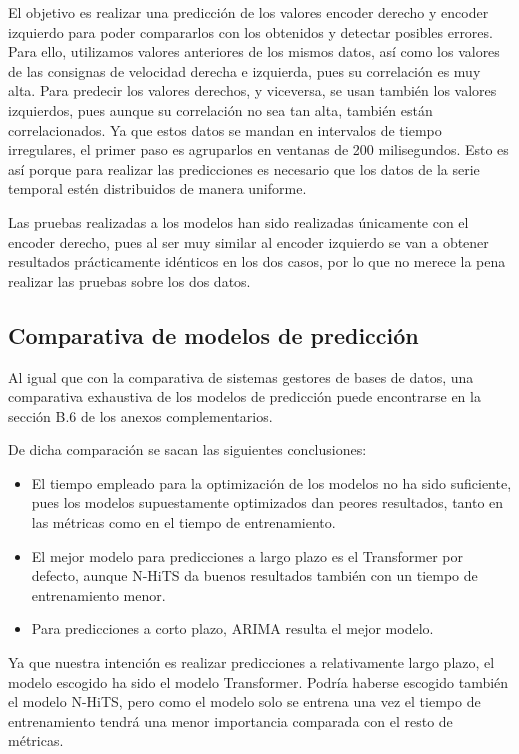 El objetivo es realizar una predicción de los valores encoder derecho y encoder izquierdo para poder 
compararlos con los obtenidos y detectar posibles errores. Para ello, utilizamos valores anteriores de los 
mismos datos, así como los valores de las consignas de velocidad derecha e izquierda, pues su correlación 
es muy alta. Para predecir los valores derechos, y viceversa, se usan también los valores izquierdos, pues aunque su 
correlación no sea tan alta, también están correlacionados.
Ya que estos datos se mandan en intervalos de tiempo irregulares, el primer paso es agruparlos en ventanas de 200 milisegundos. 
Esto es así porque para realizar las predicciones es necesario que los datos de la serie temporal estén distribuidos 
de manera uniforme.

Las pruebas realizadas a los modelos han sido realizadas únicamente con el encoder derecho, pues al ser muy similar 
al encoder izquierdo se van a obtener resultados prácticamente idénticos en los dos casos, por lo que no merece 
la pena realizar las pruebas sobre los dos datos.

\subsection{Comparativa de modelos de predicción}

Al igual que con la comparativa de sistemas gestores de bases de datos, una comparativa exhaustiva de los modelos 
de predicción puede encontrarse en la sección B.6 de los anexos complementarios.

De dicha comparación se sacan las siguientes conclusiones:
\begin{itemize}
    \item El tiempo empleado para la optimización de los modelos no ha sido suficiente, pues los modelos
        supuestamente optimizados dan peores resultados, tanto en las métricas como en el tiempo de entrenamiento.
    \item El mejor modelo para predicciones a largo plazo es el Transformer por defecto, aunque N-HiTS da buenos
        resultados también con un tiempo de entrenamiento menor.
    \item Para predicciones a corto plazo, ARIMA resulta el mejor modelo.
\end{itemize}

Ya que nuestra intención es realizar predicciones a relativamente largo plazo, el modelo escogido ha sido el modelo 
Transformer. Podría haberse escogido también el modelo N-HiTS, pero como el modelo solo se entrena una vez el tiempo 
de entrenamiento tendrá una menor importancia comparada con el resto de métricas.

